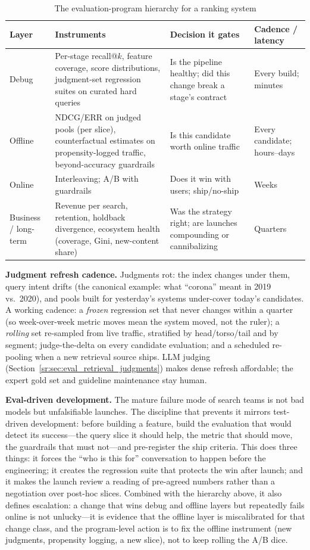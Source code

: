 \begin{table}[H]
\centering
\small
\caption{The evaluation-program hierarchy for a ranking system}
\label{sr:tab:eval_hierarchy}
\begin{tabularx}{\textwidth}{lXXX}
\toprule
\textbf{Layer} & \textbf{Instruments} & \textbf{Decision it gates} & \textbf{Cadence / latency} \\
\midrule
Debug & Per-stage recall@$k$, feature coverage, score distributions, judgment-set regression suites on curated hard queries & Is the pipeline healthy; did this change break a stage's contract & Every build; minutes \\
Offline & NDCG/ERR on judged pools (per slice), counterfactual estimates on propensity-logged traffic, beyond-accuracy guardrails & Is this candidate worth online traffic & Every candidate; hours--days \\
Online & Interleaving; A/B with guardrails & Does it win with users; ship/no-ship & Weeks \\
Business / long-term & Revenue per search, retention, holdback divergence, ecosystem health (coverage, Gini, new-content share) & Was the strategy right; are launches compounding or cannibalizing & Quarters \\
\bottomrule
\end{tabularx}
\end{table}

\textbf{Judgment refresh cadence.} Judgments rot: the index changes under them, query intent drifts (the canonical example: what ``corona'' meant in 2019 vs.\ 2020), and pools built for yesterday's systems under-cover today's candidates. A working cadence: a \textit{frozen} regression set that never changes within a quarter (so week-over-week metric moves mean the system moved, not the ruler); a \textit{rolling} set re-sampled from live traffic, stratified by head/torso/tail and by segment; judge-the-delta on every candidate evaluation; and a scheduled re-pooling when a new retrieval source ships. LLM judging (Section~\ref{sr:sec:eval_retrieval_judgments}) makes dense refresh affordable; the expert gold set and guideline maintenance stay human.

\textbf{Eval-driven development.} The mature failure mode of search teams is not bad models but unfalsifiable launches. The discipline that prevents it mirrors test-driven development: before building a feature, build the evaluation that would detect its success---the query slice it should help, the metric that should move, the guardrails that must not---and pre-register the ship criteria. This does three things: it forces the ``who is this for'' conversation to happen before the engineering; it creates the regression suite that protects the win after launch; and it makes the launch review a reading of pre-agreed numbers rather than a negotiation over post-hoc slices. Combined with the hierarchy above, it also defines escalation: a change that wins debug and offline layers but repeatedly fails online is not unlucky---it is evidence that the offline layer is miscalibrated for that change class, and the program-level action is to fix the offline instrument (new judgments, propensity logging, a new slice), not to keep rolling the A/B dice.

